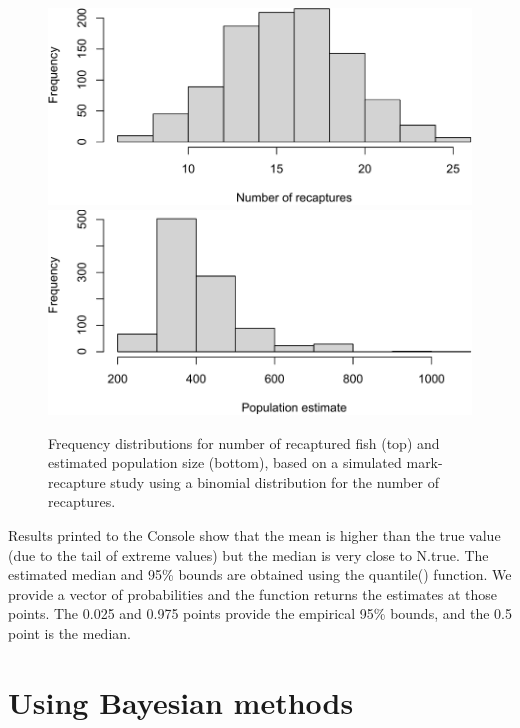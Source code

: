 \documentclass[
]{krantz}
\begin{document}
\begin{figure}
\includegraphics[width=0.9\linewidth]{bookdown_files/figure-latex/Bootstrap-1} \includegraphics[width=0.9\linewidth]{bookdown_files/figure-latex/Bootstrap-2} \caption{Frequency distributions for number of recaptured fish (top) and estimated population size (bottom), based on a simulated mark-recapture study using a binomial distribution for the number of recaptures.}\label{fig:Bootstrap}
\end{figure}

Results printed to the Console show that the mean is higher than the true value (due to the tail of extreme values) but the median is very close to N.true. The estimated median and 95\% bounds are obtained using the quantile() function. We provide a vector of probabilities and the function returns the estimates at those points. The 0.025 and 0.975 points provide the empirical 95\% bounds, and the 0.5 point is the median.

\hypertarget{JAGS-model-fit}{%
\section{Using Bayesian methods}\label{JAGS-model-fit}}
\end{document}

